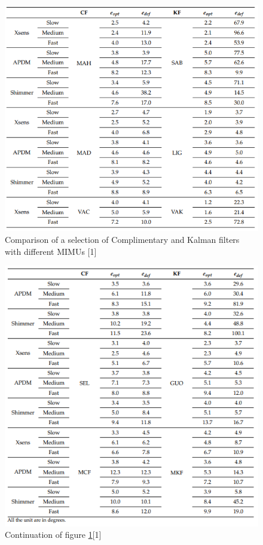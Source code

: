 \documentclass[10pt]{report}
\begin{document}
\begin{figure}[!h]
  \caption{Comparison of a selection of Complimentary and Kalman filters with different MIMUs [1]}
  \centering
  \label{fig:inputcomp}
  \includegraphics[width=1\textwidth]{input_comp.PNG}
\end{figure}
\newpage
\begin{figure}[!h]
  \caption{Continuation of figure \ref{fig:inputcomp}[1]}
  \centering
  \label{fig:inputcomp2}
  \includegraphics[width=1\textwidth]{input_comp2.PNG}
\end{figure}
\newpage
\newpage
\newpage
\newpage
\newpage
\newpage
\clearpage
\end{document}
